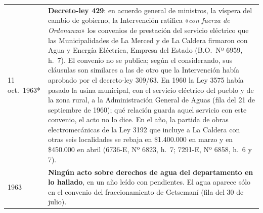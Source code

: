 \begin{longtable}{@{}p{2.7cm}p{10.3cm}@{}}
11 oct.\ 1963* & \textbf{Decreto-ley 429}: en acuerdo general de ministros, la víspera del cambio de gobierno, la Intervención ratifica «\textit{con fuerza de Ordenanza}» los convenios de prestación del servicio eléctrico que las Municipalidades de La Merced y de La Caldera firmaron con Agua y Energía Eléctrica, Empresa del Estado (B.O.\ Nº 6959, h.\ 7). El convenio no se publica; según el considerando, sus cláusulas son similares a las de otro que la Intervención había aprobado por el decreto-ley 309/63. En 1960 la Ley 3575 había pasado la usina municipal, con el servicio eléctrico del pueblo y de la zona rural, a la Administración General de Aguas (fila del 21 de septiembre de 1960); qué relación guarda aquel servicio con este convenio, el acto no lo dice. En el año, la partida de obras electromecánicas de la Ley 3192 que incluye a La Caldera con otras seis localidades se rebaja en \$1.400.000 en marzo y en \$450.000 en abril (6736-E, Nº 6823, h.\ 7; 7291-E, Nº 6858, h.\ 6 y 7). \\
1963 & \textbf{Ningún acto sobre derechos de agua del departamento en lo hallado}, en un año leído con pendientes. El agua aparece sólo en el convenio del fraccionamiento de Getsemaní (fila del 30 de julio). \\

\end{longtable}
